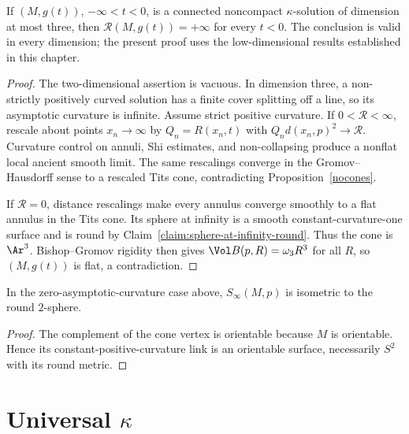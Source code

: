 \begin{proposition}\label{prop:asymptotic-scalar-curvature-infinite}
\label{asympscal}
If $(M,g(t))$, $-\infty<t<0$, is a connected noncompact
$\kappa$-solution of dimension at most three, then
$\mathcal R(M,g(t))=+\infty$ for every $t<0$.
The conclusion is valid in every dimension; the present proof uses
the low-dimensional results established in this chapter.
\end{proposition}
\begin{proof}
\sketch
{}
The two-dimensional assertion is vacuous. In dimension three, a
non-strictly positively curved solution has a finite cover splitting
off a line, so its asymptotic curvature is infinite. Assume strict
positive curvature. If $0<\mathcal R<\infty$, rescale about points
$x_n\to\infty$ by $Q_n=R(x_n,t)$ with
$Q_nd(x_n,p)^2\to\mathcal R$. Curvature control on annuli, Shi
estimates, and non-collapsing produce a nonflat local ancient smooth
limit. The same rescalings converge in the Gromov--Hausdorff sense
to a rescaled Tits cone, contradicting Proposition~\ref{nocones}.

If $\mathcal R=0$, distance rescalings make every annulus converge
smoothly to a flat annulus in the Tits cone. Its sphere at infinity
is a smooth constant-curvature-one surface and is round by
Claim~\ref{claim:sphere-at-infinity-round}. Thus the cone is
$\Ar^3$. Bishop--Gromov rigidity then gives
$\Vol B(p,R)=\omega_3R^3$ for all $R$, so $(M,g(t))$ is flat, a
contradiction.
\end{proof}

\begin{claim}\label{claim:sphere-at-infinity-round}
In the zero-asymptotic-curvature case above,
$S_\infty(M,p)$ is isometric to the round $2$-sphere.
\end{claim}
\begin{proof}
\sketch The complement of the cone vertex is orientable because
$M$ is orientable. Hence its constant-positive-curvature link is an
orientable surface, necessarily $S^2$ with its round metric.
\end{proof}

\section{Universal $\kappa$}

